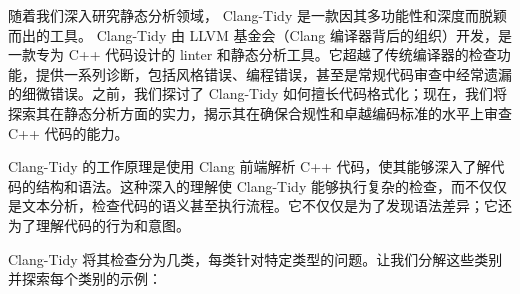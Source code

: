 
随着我们深入研究静态分析领域， Clang-Tidy 是一款因其多功能性和深度而脱颖而出的工具。 Clang-Tidy 由 LLVM 基金会（Clang 编译器背后的组织）开发，是一款专为 C++ 代码设计的 linter 和静态分析工具。它超越了传统编译器的检查功能，提供一系列诊断，包括风格错误、编程错误，甚至是常规代码审查中经常遗漏的细微错误。之前，我们探讨了 Clang-Tidy 如何擅长代码格式化；现在，我们将探索其在静态分析方面的实力，揭示其在确保合规性和卓越编码标准的水平上审查 C++ 代码的能力。

Clang-Tidy 的工作原理是使用 Clang 前端解析 C++ 代码，使其能够深入了解代码的结构和语法。这种深入的理解使 Clang-Tidy 能够执行复杂的检查，而不仅仅是文本分析，检查代码的语义甚至执行流程。它不仅仅是为了发现语法差异；它还为了理解代码的行为和意图。


Clang-Tidy 将其检查分为几类，每类针对特定类型的问题。让我们分解这些类别并探索每个类别的示例：

